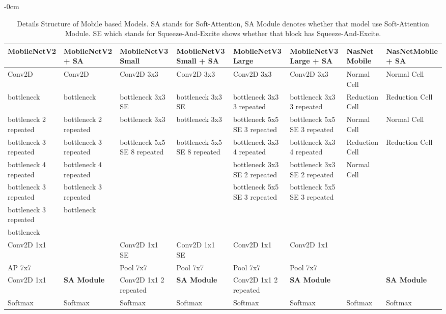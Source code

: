 \documentclass[sensors,article,submit,pdftex,moreauthors]{Definitions/mdpi}
\begin{document}
\begin{table}[H]
	\begin{adjustwidth}{-\extralength}{0cm}
		\begin{tabularx}{\fulllength}{p{1.8cm} | p{1.8cm} | p{1.9cm} | p{1.9cm} | p{1.9cm} | p{1.8cm} | p{1.8cm} | p{1.9cm}}
			\toprule
			\textbf{MobileNetV2} & \textbf{MobileNetV2 + SA} & \textbf{MobileNetV3 Small} & \textbf{MobileNetV3 Small + SA} & \textbf{MobileNetV3 Large} & \textbf{MobileNetV3 Large + SA} & \textbf{NasNet Mobile} & \textbf{NasNetMobile + SA}\\
			\midrule
			Conv2D & Conv2D& Conv2D 3x3& Conv2D 3x3& Conv2D 3x3& Conv2D 3x3 & Normal Cell & Normal Cell\\	\hline		
			bottleneck & bottleneck & bottleneck 3x3 SE& bottleneck 3x3 SE& bottleneck 3x3 3 repeated& bottleneck 3x3 3 repeated& Reduction Cell& Reduction Cell\\ \hline					
			bottleneck 2 repeated& bottleneck 2 repeated& bottleneck 3x3& bottleneck 3x3& bottleneck 5x5 SE 3 repeated& bottleneck 5x5 SE 3 repeated & Normal Cell & Normal Cell\\ \hline	
			bottleneck 3 repeated& bottleneck 3 repeated& bottleneck 5x5 SE 8 repeated& bottleneck 5x5 SE 8 repeated& bottleneck 3x3 4 repeated& bottleneck 3x3 4 repeated& Reduction Cell & Reduction Cell\\ \hline	
			bottleneck 4 repeated& bottleneck 4 repeated& & & bottleneck 3x3 SE 2 repeated& bottleneck 3x3 SE 2 repeated & Normal Cell\\ \hline	
			bottleneck 3 repeated& bottleneck 3 repeated& & & bottleneck 5x5 SE 3 repeated& bottleneck 5x5 SE 3 repeated& \\ \hline	
			bottleneck 3 repeated& bottleneck & & & & & \\ \hline	
			bottleneck & & & & & & \\ \hline
			Conv2D 1x1 & & Conv2D 1x1 SE & Conv2D 1x1 SE& Conv2D 1x1& Conv2D 1x1 & & \\ \hline
			AP 7x7 & & Pool 7x7& Pool 7x7& Pool 7x7& Pool 7x7& &\\ \hline
			Conv2D 1x1 & \textbf{SA Module}& Conv2D 1x1 2 repeated& \textbf{SA Module}& Conv2D 1x1 2 repeated& \textbf{SA Module}& &\textbf{SA Module}\\ \hline
			Softmax & Softmax& Softmax& Softmax& Softmax& Softmax& Softmax & Softmax\\ 
			\bottomrule
		\end{tabularx}
	\end{adjustwidth}
	\caption{Details Structure of Mobile based Models. SA stands for Soft-Attention, SA Module denotes whether that model use Soft-Attention Module. SE which stands for Squeeze-And-Excite shows whether that block has Squeeze-And-Excite. \label{detailed mobile model structure}}
\end{table}
\end{document}

